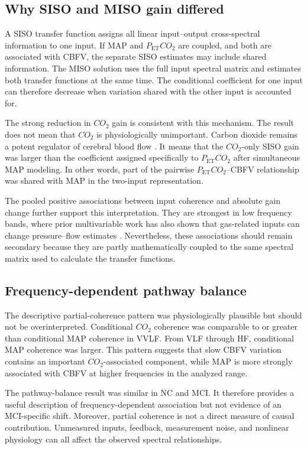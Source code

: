 \documentclass[12pt]{article}
\newcommand{\PETCOtwo}{P_{\mathrm{ET}}CO_2}
\newcommand{\COtwo}{CO_2}
\begin{document}
\subsection{Why SISO and MISO gain differed}

A SISO transfer function assigns all linear input--output cross-spectral
information to one input. If MAP and $\PETCOtwo$ are coupled, and both are
associated with CBFV, the separate SISO estimates may include shared
information. The MISO solution uses the full input spectral matrix and
estimates both transfer functions at the same time. The conditional coefficient
for one input can therefore decrease when variation shared with the other
input is accounted for.

The strong reduction in $\COtwo$ gain is consistent with this mechanism. The
result does not mean that $\COtwo$ is physiologically unimportant. Carbon
dioxide remains a potent regulator of cerebral blood flow
\cite{Hoiland2019}. It means that the $\COtwo$-only SISO gain was larger than
the coefficient assigned specifically to $\PETCOtwo$ after simultaneous MAP
modeling. In other words, part of the pairwise $\PETCOtwo$--CBFV relationship
was shared with MAP in the two-input representation.

The pooled positive associations between input coherence and absolute gain
change further support this interpretation. They are strongest in low
frequency bands, where prior multivariable work has also shown that gas-related
inputs can change pressure--flow estimates \cite{Panerai2000,Peng2008}.
Nevertheless, these associations should remain secondary because they are
partly mathematically coupled to the same spectral matrix used to calculate
the transfer functions.

\subsection{Frequency-dependent pathway balance}

The descriptive partial-coherence pattern was physiologically plausible but
should not be overinterpreted. Conditional $\COtwo$ coherence was comparable
to or greater than conditional MAP coherence in VVLF. From VLF through HF,
conditional MAP coherence was larger. This pattern suggests that slow CBFV
variation contains an important $\COtwo$-associated component, while MAP is
more strongly associated with CBFV at higher frequencies in the analyzed
range.

The pathway-balance result was similar in NC and MCI. It therefore provides a
useful description of frequency-dependent association but not evidence of an
MCI-specific shift. Moreover, partial coherence is not a direct measure of
causal contribution. Unmeasured inputs, feedback, measurement noise, and
nonlinear physiology can all affect the observed spectral relationships.
\end{document}

